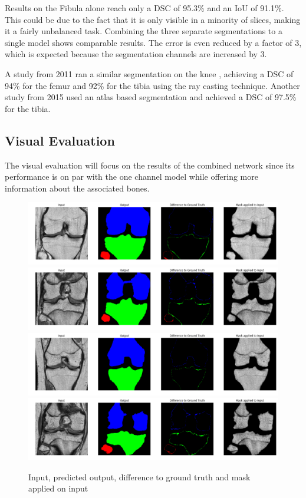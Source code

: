 Results on the Fibula alone reach only a DSC of 95.3\% and an IoU of 91.1\%. This could be due to the fact that it is only visible in a minority of slices, making it a fairly unbalanced task. Combining the three separate segmentations to a single model shows comparable results. The error is even reduced by a factor of 3, which is expected because the segmentation channels are increased by 3.

A study from 2011 ran a similar segmentation on the knee \cite{Martel-Pelletier2011}, achieving a DSC of 94\% for the femur and 92\% for the tibia using the ray casting technique. Another study from 2015 \cite{Dam} used an atlas based segmentation and achieved a DSC of 97.5\% for the tibia.

\subsection{Visual Evaluation}

The visual evaluation will focus on the results of the combined network since its performance is on par with the one channel model while offering more information about the associated bones.

\begin{figure}[H]
\centering
\par
\includegraphics[width=1.0\textwidth]{imgs/sample1.png}
\includegraphics[width=1.0\textwidth]{imgs/sample2.png}
\includegraphics[width=1.0\textwidth]{imgs/sample4.png}
\includegraphics[width=1.0\textwidth]{imgs/sample3.png}
\caption{Input, predicted output, difference to ground truth and mask applied on input}
\par
\end{figure}

